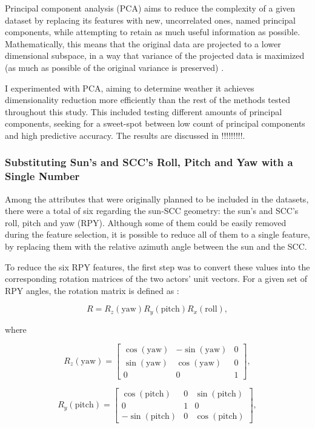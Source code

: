 Principal component analysis (PCA) aims to reduce the complexity of a given dataset by replacing its features with new, uncorrelated ones, named principal components, while attempting to retain as much useful information as possible. Mathematically, this means that the original data are projected to a lower dimensional subspace, in a way that variance of the projected data is maximized (as much as possible of the original variance is preserved) \cite{shlens2005pca}.

I experimented with PCA, aiming to determine weather it achieves dimensionality reduction more efficiently than the rest of the methods tested throughout this study. This included testing different amounts of principal components, seeking for a sweet-spot between low count of principal components and high predictive accuracy. The results are discussed in !!!!!!!!!.

\subsubsection{Substituting Sun's and SCC's Roll, Pitch and Yaw with a Single Number}

Among the attributes that were originally planned to be included in the datasets, there were a total of six regarding the sun-SCC geometry: the sun's and SCC's roll, pitch and yaw (RPY). Although some of them could be easily removed during the feature selection, it is possible to reduce all of them to a single feature, by replacing them with the relative azimuth angle between the sun and the SCC. 

To reduce the six RPY features, the first step was to convert these values into the corresponding rotation matrices of the two actors' unit vectors. For a given set of RPY angles, the rotation matrix is defined as \cite{rot-mat}:

\[ 
R = R_z(\mathrm{yaw})R_y(\mathrm{pitch})R_x(\mathrm{roll}),
\]


where

\[
R_z(\mathrm{yaw}) =
\begin{bmatrix}
\cos(\mathrm{yaw}) & -\sin(\mathrm{yaw}) & 0\\
\sin(\mathrm{yaw}) & \cos(\mathrm{yaw}) & 0\\
0 & 0 & 1
\end{bmatrix},
\]

\[
R_y(\mathrm{pitch}) =
\begin{bmatrix}
\cos(\mathrm{pitch}) & 0 & \sin(\mathrm{pitch})\\
0 & 1 & 0\\
-\sin(\mathrm{pitch}) & 0 & \cos(\mathrm{pitch})
\end{bmatrix},
\]


